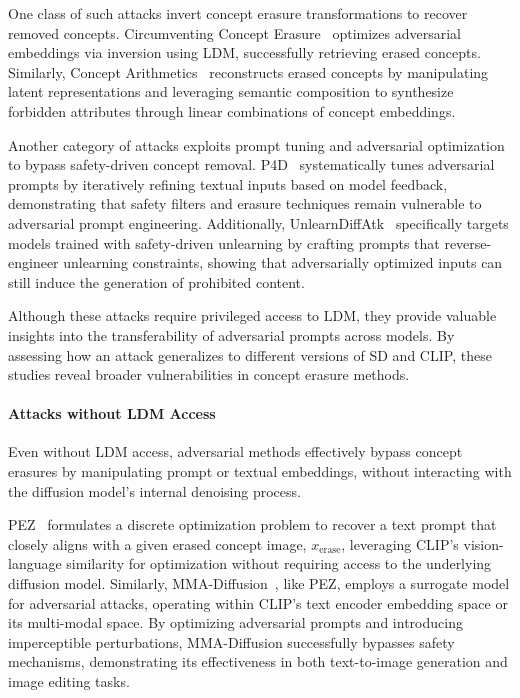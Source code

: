 One class of such attacks invert concept erasure transformations to recover removed concepts.  
Circumventing Concept Erasure~\cite{pham2024circumventing} optimizes adversarial embeddings via inversion using LDM, successfully retrieving erased concepts. Similarly, Concept Arithmetics~\cite{Petsiuk2024ConceptAF} reconstructs erased concepts by manipulating latent representations and leveraging semantic composition to synthesize forbidden attributes through linear combinations of concept embeddings.

Another category of attacks exploits prompt tuning and adversarial optimization to bypass safety-driven concept removal. P4D~\cite{p4d} systematically tunes adversarial prompts by iteratively refining textual inputs based on model feedback, demonstrating that safety filters and erasure techniques remain vulnerable to adversarial prompt engineering. Additionally, UnlearnDiffAtk~\cite{to_generate_or_not} specifically targets models trained with safety-driven unlearning by crafting prompts that reverse-engineer unlearning constraints, showing that adversarially optimized inputs can still induce the generation of prohibited content.

Although these attacks require privileged access to LDM, they provide valuable insights into the transferability of adversarial prompts across models. By assessing how an attack generalizes to different versions of SD and CLIP, these studies reveal broader vulnerabilities in concept erasure methods.

\paragraph{Attacks without LDM Access}  
Even without LDM access, adversarial methods effectively bypass concept erasures by manipulating prompt or textual embeddings, without interacting with the diffusion model’s internal denoising process.

PEZ~\cite{hard_prompt} formulates a discrete optimization problem to recover a text prompt that closely aligns with a given erased concept image, \( x_{\text{erase}} \), leveraging CLIP’s vision-language similarity for optimization without requiring access to the underlying diffusion model. 
Similarly, MMA-Diffusion~\cite{Yang2023MMADiffusionMA}, like PEZ, employs a surrogate model for adversarial attacks, operating within CLIP’s text encoder embedding space or its multi-modal space. By optimizing adversarial prompts and introducing imperceptible perturbations, MMA-Diffusion successfully bypasses safety mechanisms, demonstrating its effectiveness in both text-to-image generation and image editing tasks.


